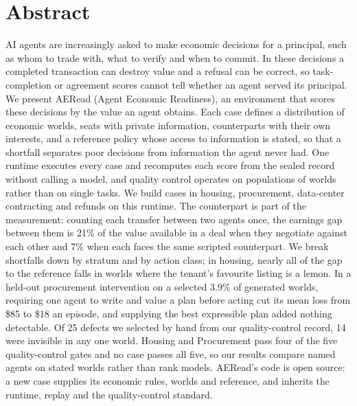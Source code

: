 \section*{Abstract}

AI agents are increasingly asked to make economic decisions for a
principal, such as whom to trade with, what to verify and when to commit. In these decisions a completed
transaction can destroy value and a refusal can be correct, so
task-completion or agreement scores cannot tell whether an agent served its
principal. We present AERead (Agent Economic Readiness), an environment that
scores these decisions by the value an agent obtains. Each case defines a
distribution of economic worlds, seats with private information,
counterparts with their own interests, and a reference policy whose access
to information is stated, so that a shortfall separates poor decisions from
information the agent never had. One runtime executes every case and recomputes
each score from the sealed record without calling a model, and quality control operates on
populations of worlds rather than on single tasks. We build cases in housing, procurement, data-center contracting
and refunds on this runtime. The counterpart is
part of the measurement: counting each transfer between two agents once, the earnings gap between
them is 21\% of the value available in a deal when they negotiate against each other and 7\% when each faces the
same scripted counterpart. We break shortfalls down by stratum and by action
class; in housing, nearly all of the gap to the reference falls in worlds
where the tenant's favourite listing is a lemon. In a held-out procurement intervention on a selected 3.9\% of generated worlds, requiring one agent to write and
value a plan before acting cut its mean loss from \$85 to \$18 an episode, and supplying the best expressible plan
added nothing detectable. Of 25 defects we selected by
hand from our quality-control record, 14 were invisible in any one world. Housing and
Procurement pass four of the five quality-control gates and no case passes all five,
so our results compare named agents on stated worlds rather than rank models. AERead's code is open source: a
new case supplies its economic rules, worlds and reference, and inherits
the runtime, replay and the quality-control standard.
